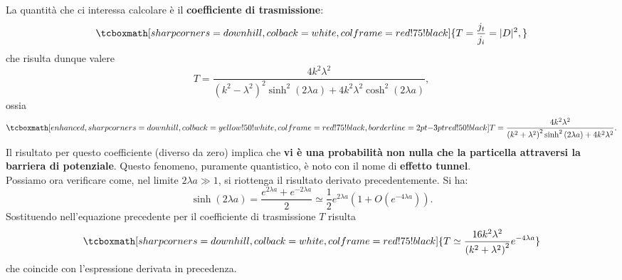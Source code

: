 La quantità che ci interessa calcolare è il \textbf{coefficiente di trasmissione}:
	\begin{equation}
		\tcboxmath[sharp corners=downhill, colback=white, colframe=red!75!black]{
			T=\frac{j_t}{j_i} =|D|^2,
			}
	\end{equation}
che risulta dunque valere
	\begin{equation}
		T=\frac{4k^2 \lambda ^2}{\left(k^2-\lambda^2\right) ^2\sinh ^2\left(2\lambda a\right)+4k^2\lambda ^2\cosh ^2\left(2\lambda a\right)},
	\end{equation}
ossia
	\begin{equation}
		\tcboxmath[enhanced, sharp corners=downhill, colback=yellow!50!white, colframe=red!75!black, borderline={2pt}{-3pt}{red!50!black}]{
			T=\frac{4k^2 \lambda ^2}{\left(k^2+\lambda^2\right) ^2\sinh ^2\left(2\lambda a\right)+4k^2\lambda ^2}.
			}
	\end{equation}
Il risultato per questo coefficiente (diverso da zero) implica che \textbf{vi è una probabilità non nulla che la particella attraversi la barriera di potenziale}. Questo fenomeno, puramente quantistico, è noto con il nome di \textbf{effetto tunnel}.\\

Possiamo ora verificare come, nel limite $2\lambda a \gg 1$, si riottenga il risultato derivato precedentemente. Si ha:
	\begin{equation}
		\sinh \left( 2 \lambda a \right) = \frac{e^{2\lambda a }+ e ^{-2\lambda a }}{2} \simeq \frac{1}{2} e^{2\lambda a} \left( 1+ O(e^{-4\lambda a}) \right).
\end{equation}
Sostituendo nell'equazione precedente per il coefficiente di trasmissione $T$ risulta
	\begin{equation}
		\tcboxmath[sharp corners=downhill, colback=white, colframe=red!75!black]{
		T \simeq \frac{16k^2 \lambda ^2}{\left( k^2+\lambda ^2\right) ^2}e^{-4\lambda a }}
	\end{equation}
che coincide con l'espressione derivata in precedenza.

